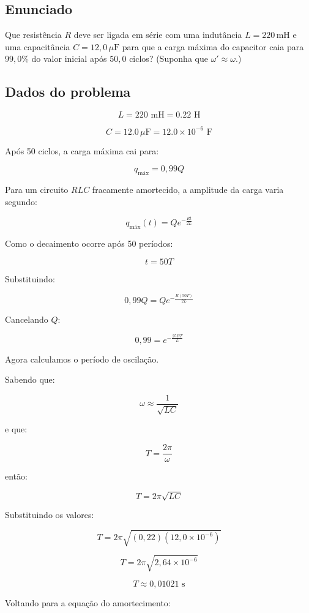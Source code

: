 \documentclass[12pt,a4paper]{article}
\begin{document}
\subsection*{Enunciado}

Que resistência $R$ deve ser ligada em série com uma indutância
$L = 220\,\text{mH}$ e uma capacitância
$C = 12,0\,\mu\text{F}$
para que a carga máxima do capacitor caia para $99,0\%$
do valor inicial após $50,0$ ciclos?
(Suponha que $\omega' \approx \omega$.)

\subsection*{Dados do problema}

\[
L = \num{220}\text{ mH} = \num{0,22}\text{ H}
\]

\[
C = \num{12,0}\,\mu\text{F} = \num{12,0}\times10^{-6}\text{ F}
\]

Após 50 ciclos, a carga máxima cai para:

\[
q_{\text{máx}} = 0{,}99Q
\]

\vspace{0.3cm}

Para um circuito $RLC$ fracamente amortecido, a amplitude da carga varia segundo:

\[
q_{\text{máx}}(t)=Qe^{-\frac{Rt}{2L}}
\]

Como o decaimento ocorre após 50 períodos:

\[
t=50T
\]

Substituindo:

\[
0{,}99Q = Qe^{-\frac{R(50T)}{2L}}
\]

Cancelando $Q$:

\[
0{,}99=e^{-\frac{25RT}{L}}
\]

Agora calculamos o período de oscilação.

Sabendo que:

\[
\omega \approx \frac{1}{\sqrt{LC}}
\]

e que:

\[
T=\frac{2\pi}{\omega}
\]

então:

\[
T=2\pi\sqrt{LC}
\]

Substituindo os valores:

\[
T=2\pi\sqrt{(0{,}22)(12,0\times10^{-6})}
\]

\[
T=2\pi\sqrt{2{,}64\times10^{-6}}
\]

\[
T\approx 0{,}01021\text{ s}
\]

Voltando para a equação do amortecimento:
\end{document}

